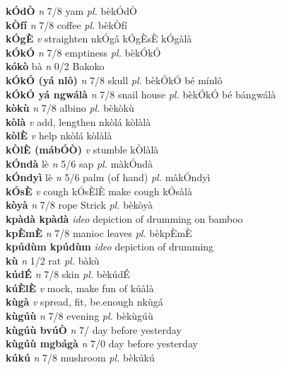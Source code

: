 \documentclass{article}
\begin{document}
{\bf kÓdÒ}  {\it n} 7/8 yam {\it pl.} bèkÓdÒ         \\ 
{\bf kÒfí}  {\it n} 7/8 coffee {\it pl.} bèkÒfí         \\ 
{\bf kÓgÈ}  {\it v} straighten   nkÓgâ  kÓgÈsÈ kÓgàlà   \\ 
{\bf kÓkÓ}  {\it n} 7/8 emptiness {\it pl.} bèkÓkÓ         \\ 
{\bf kókò} bà {\it n} 0/2 Bakoko         \\ 
{\bf kÓkÓ (yá nlô)}  {\it n} 7/8 skull {\it pl.} bèkÓkÓ bé mínlô         \\ 
{\bf kÓkÓ yá ngwálà}  {\it n} 7/8 snail house {\it pl.} bèkÓkÓ bé bángwálà         \\ 
{\bf kòkù}  {\it n} 7/8 albino {\it pl.} bèkòkù         \\ 
{\bf kòlà}  {\it v} add, lengthen   nkòlá   kòlàlà   \\ 
{\bf kòlÈ}  {\it v} help   nkòlá   kòlàlà   \\ 
{\bf kÒlÈ (mábÓÒ)}  {\it v} stumble      kÒlàlà   \\ 
{\bf kÓndà} lè {\it n} 5/6 sap {\it pl.} màkÓndà         \\ 
{\bf kÓndyì} lè {\it n} 5/6 palm (of hand) {\it pl.} màkÓndyì         \\ 
{\bf kÓsÈ}  {\it v} cough    kÓsÈlÈ make cough  kÓsàlà   \\ 
{\bf kòyà}  {\it n} 7/8 rope Strick {\it pl.} bèkòyà         \\ 
{\bf kpàdà kpàdà}  {\it ideo} depiction of drumming on bamboo         \\ 
{\bf kpÈmÈ}  {\it n} 7/8 manioc leaves {\it pl.} bèkpÈmÈ         \\ 
{\bf kpúdùm kpúdùm}  {\it ideo} depiction of drumming         \\ 
{\bf kù}  {\it n} 1/2 rat {\it pl.} bàkù         \\ 
{\bf kúdÉ}  {\it n} 7/8 skin {\it pl.} bèkúdÉ         \\ 
{\bf kúÈlÈ}  {\it v} mock, make fun of      kúàlà   \\ 
{\bf kùgà}  {\it v} spread, fit, be.enough   nkùgá      \\ 
{\bf kùgúù}  {\it n} 7/8 evening {\it pl.} bèkùgúù         \\ 
{\bf kùgúù bvúÒ}  {\it n} 7/ day before yesterday         \\ 
{\bf kùgúù mgbágà}  {\it n} 7/0 day before yesterday         \\ 
{\bf kúkú}  {\it n} 7/8 mushroom {\it pl.} bèkúkú         \\ 
\end{document}
